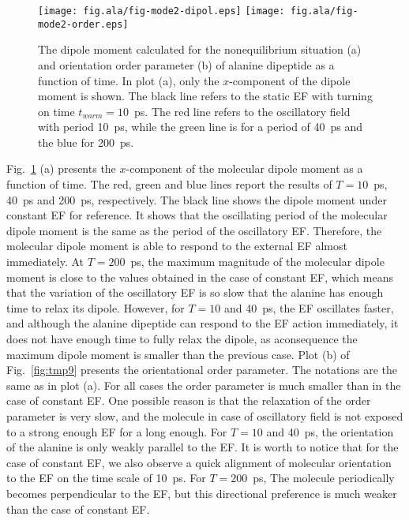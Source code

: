 \documentclass[a4paper,preprint,unsortedaddress,onecolumn]{revtex4-1}
\begin{document}
\begin{figure}
  \centering
  \texttt{[image: fig.ala/fig-mode2-dipol.eps]}
  \texttt{[image: fig.ala/fig-mode2-order.eps]}
  \caption{The dipole moment calculated for the nonequilibrium situation (a) and
    orientation order parameter (b) of alanine dipeptide as a
    function of time. In plot (a),
    only the $x$-component of the dipole moment is
    shown. The black line refers to the static EF with turning on
    time $t_{warm} = 10$~ps. The red line refers to the oscillatory field with period
    10~ps, while the green line is for a period of 40~ps and the blue for 200~ps.}
  \label{fig:tmp8}
\end{figure}


Fig.~\ref{fig:tmp8} (a)
presents the $x$-component of the molecular dipole moment as
a function of time. The red, green and blue lines report the
results of $T=10$~ps, 40~ps and 200~ps, respectively. The black line
shows the dipole moment under constant EF
for reference.
It shows that the oscillating period of the molecular dipole moment
is the same as the period of the oscillatory EF. Therefore,
the molecular dipole moment
is able to respond to the external EF almost immediately.
At $T=200$~ps, the maximum magnitude of the molecular
dipole moment is close to the values obtained in the case of constant EF, which
means that the variation of the oscillatory EF is so slow that the
alanine has enough time to 
relax its dipole. However,
for $T=10$ and 40~ps, the EF oscillates faster,
and although the alanine dipeptide can respond to the EF action immediately,
it does not have enough time to fully relax the dipole, as aconsequence the maximum dipole moment is smaller than the previous case.
Plot (b) of Fig.~\ref{fig:tmp9} presents the orientational order
parameter. The notations are the same as in plot (a).
For all cases the order parameter is much
smaller than in the case of constant EF. One possible reason is that the
relaxation of the order parameter is very slow, and the molecule in case of oscillatory field is
not exposed to a strong enough EF for a long enough. For  $T=10$ and 40~ps, the orientation of the alanine is only weakly
parallel to the EF. It is worth to notice that for the case of constant EF,
we also observe a quick alignment of molecular orientation to the EF
on the time scale of 10~ps. For $T=200$~ps, The molecule periodically
becomes perpendicular to the EF, but this directional preference is much
weaker than the case of constant EF.
\end{document}
